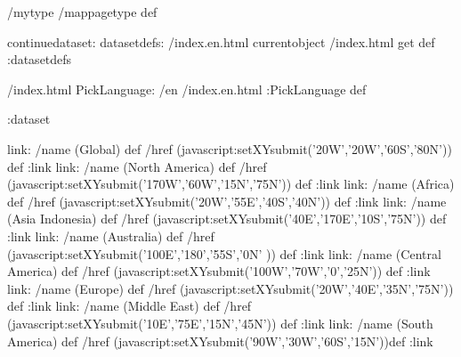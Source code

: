 \begin{ingrid}
/mytype /mappagetype def

continuedataset:
datasetdefs:
/index.en.html currentobject /index.html get def
:datasetdefs

/index.html {
PickLanguage:
/en /index.en.html
:PickLanguage
} def

:dataset

link:
/name (Global) def
/href (javascript:setXYsubmit('20W','20W','60S','80N')) def
:link
link:
/name (North America) def
/href (javascript:setXYsubmit('170W','60W','15N','75N')) def
:link
link:
/name (Africa) def
/href (javascript:setXYsubmit('20W','55E','40S','40N')) def
:link
link:
/name (Asia Indonesia) def
/href (javascript:setXYsubmit('40E','170E','10S','75N')) def
:link
link:
/name (Australia) def
/href (javascript:setXYsubmit('100E','180','55S','0N' )) def
:link
link:
/name (Central America) def
/href (javascript:setXYsubmit('100W','70W','0','25N')) def
:link
link:
/name (Europe) def
/href (javascript:setXYsubmit('20W','40E','35N','75N')) def
:link
link:
/name (Middle East) def
/href (javascript:setXYsubmit('10E','75E','15N','45N')) def
:link
link:
/name (South America) def
/href (javascript:setXYsubmit('90W','30W','60S','15N'))def
:link

\end{ingrid}

